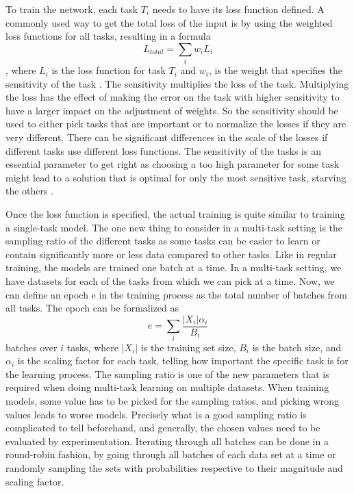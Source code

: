 To train the network, each task ${T_i}$ needs to have its loss function defined.
A commonly used way to get the total loss of the input is by using the weighted loss functions for all tasks, resulting in a formula \[L_{total} = \sum_i{w_i L_i}\] \noindent, where ${L_i}$ is the loss function for task ${T_i}$ and ${w_i}$, is the weight that specifies the sensitivity of the task \citep{usingUncertaintyToWeighLosses}. 
The sensitivity multiplies the loss of the task.
Multiplying the loss has the effect of making the error on the task with higher sensitivity to have a larger impact on the adjustment of weights.
So the sensitivity should be used to either pick tasks that are important or to normalize the losses if they are very different.
There can be significant differences in the scale of the losses if different tasks use different loss functions.
The sensitivity of the tasks is an essential parameter to get right as choosing a too high parameter for some task might lead to a solution that is optimal for only the most sensitive task, starving the others \citep{whichTasks}.

Once the loss function is specified, the actual training is quite similar to training a single-task model.
The one new thing to consider in a multi-task setting is the sampling ratio of the different tasks as some tasks can be easier to learn or contain significantly more or less data compared to other tasks.
Like in regular training, the models are trained one batch at a time. 
In a multi-task setting, we have datasets for each of the tasks from which we can pick at a time.
Now, we can define an epoch e in the training process as the total number of batches from all tasks. 
The epoch can be formalized as \[ e = \sum_i{ \dfrac{|X_i| \alpha_i}{B_i}}\] \noindent batches over $i$ tasks, where $|X_i|$ is the training set size, $B_i$ is the batch size, and $\alpha_i$ is the scaling factor for each task, telling how important the specific task is for the learning process.
The sampling ratio is one of the new parameters that is required when doing multi-task learning on multiple datasets.
When training models, some value has to be picked for the sampling ratios, and picking wrong values leads to worse models.
Precisely what is a good sampling ratio is complicated to tell beforehand, and generally, the chosen values need to be evaluated by experimentation.
Iterating through all batches can be done in a round-robin fashion, by going through all batches of each data set at a time or randomly sampling the sets with probabilities respective to their magnitude and scaling factor.

